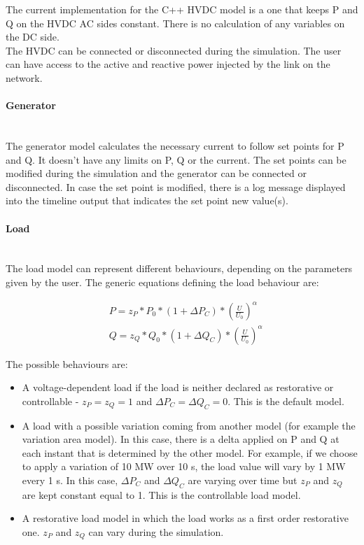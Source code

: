 \documentclass[a4paper, 12pt]{report}
\begin{document}
The current implementation for the C++ HVDC model is a one that keeps P and Q on the HVDC AC sides constant. There is no calculation of any variables on the DC side. \\
The HVDC can be connected or disconnected during the simulation. The user can have access to the active and reactive power injected by the link on the network. \\

\paragraph{Generator}
~~\\

The generator model calculates the necessary current to follow set points for P and Q. It doesn't have any limits on P, Q or the current. The set points can be modified during the simulation and the generator can be connected or disconnected. In case the set point is modified, there is a log message displayed into the timeline output that indicates the set point new value(s). \\

\paragraph{Load}
~~\\

The load model can represent different behaviours, depending on the parameters given by the user. The generic equations defining the load behaviour are:

\begin{equation}
\begin{aligned}
& P = z_{P} * P_{0} * (1 + \Delta P_{C}) * (\frac{U}{U_{0}})^\alpha \\
& Q = z_{Q} * Q_{0} * (1 + \Delta Q_{C}) * (\frac{U}{U_{0}})^\alpha
\end{aligned}
\label{Load model}
\end{equation}

The possible behaviours are:
\begin{itemize}
\item A voltage-dependent load if the load is neither declared as restorative or controllable - $z_{P} = z_{Q} = 1$ and $\Delta P_{C} = \Delta Q_{C} = 0 $. This is the default model.
\item A load with a possible variation coming from another model (for example the variation area model). In this case, there is a delta applied on P and Q at each instant that is determined by the other model. For example, if we choose to apply a variation of 10 MW over 10 s, the load value will vary by 1 MW every 1 s. In this case, $\Delta P_{C}$ and $\Delta Q_{C}$ are varying over time but $z_{P}$ and $z_{Q}$ are kept constant equal to 1. This is the controllable load model.
\item A restorative load model in which the load works as a first order restorative one. $z_{P}$ and $z_{Q}$ can vary during the simulation.
\end{itemize}
\end{document}
